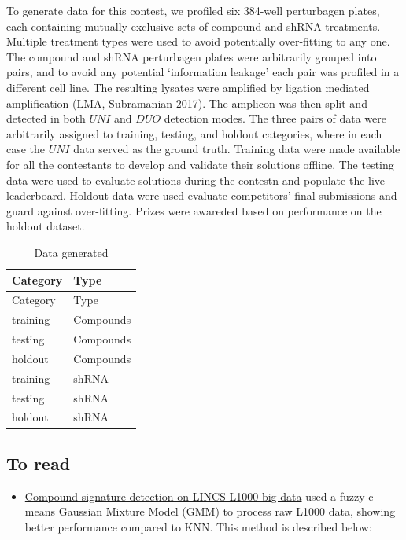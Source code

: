 \documentclass[]{article}
\providecommand{\tightlist}{%
  \setlength{\itemsep}{0pt}\setlength{\parskip}{0pt}}
\begin{document}
To generate data for this contest, we profiled six 384-well perturbagen
plates, each containing mutually exclusive sets of compound and shRNA
treatments. Multiple treatment types were used to avoid potentially
over-fitting to any one. The compound and shRNA perturbagen plates were
arbitrarily grouped into pairs, and to avoid any potential `information
leakage' each pair was profiled in a different cell line. The resulting
lysates were amplified by ligation mediated amplification (LMA,
Subramanian 2017). The amplicon was then split and detected in both
\(UNI\) and \(DUO\) detection modes. The three pairs of data were
arbitrarily assigned to training, testing, and holdout categories, where
in each case the \(UNI\) data served as the ground truth. Training data
were made available for all the contestants to develop and validate
their solutions offline. The testing data were used to evaluate
solutions during the contestn and populate the live leaderboard. Holdout
data were used evaluate competitors' final submissions and guard against
over-fitting. Prizes were awareded based on performance on the holdout
dataset.

\begin{longtable}[]{@{}ll@{}}
\caption{Data generated}\tabularnewline
\toprule
Category & Type\tabularnewline
\midrule
\endfirsthead
\toprule
Category & Type\tabularnewline
\midrule
\endhead
training & Compounds\tabularnewline
testing & Compounds\tabularnewline
holdout & Compounds\tabularnewline
training & shRNA\tabularnewline
testing & shRNA\tabularnewline
holdout & shRNA\tabularnewline
\bottomrule
\end{longtable}

\hypertarget{to-read}{%
\subsection{To read}\label{to-read}}

\begin{itemize}
\tightlist
\item
  \href{https://pubs.rsc.org/en/content/getauthorversionpdf/c4mb00677a}{Compound
  signature detection on LINCS L1000 big data} used a fuzzy c-means
  Gaussian Mixture Model (GMM) to process raw L1000 data, showing better
  performance compared to KNN. This method is described below:
\end{itemize}
\end{document}
